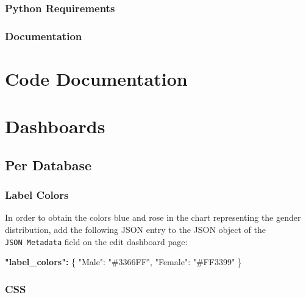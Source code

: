 \documentclass[
]{book}
\newenvironment{Shaded}{\begin{snugshade}}{\end{snugshade}}
\newcommand{\DataTypeTok}[1]{\textcolor[rgb]{0.13,0.29,0.53}{#1}}
\newcommand{\ErrorTok}[1]{\textcolor[rgb]{0.64,0.00,0.00}{\textbf{#1}}}
\newcommand{\FunctionTok}[1]{\textcolor[rgb]{0.00,0.00,0.00}{#1}}
\newcommand{\StringTok}[1]{\textcolor[rgb]{0.31,0.60,0.02}{#1}}
\begin{document}
\hypertarget{python-requirements}{%
\subsection*{Python Requirements}\label{python-requirements}}

\hypertarget{documentation}{%
\subsection*{Documentation}\label{documentation}}

\hypertarget{code-documentation}{%
\chapter{Code Documentation}\label{code-documentation}}

\hypertarget{dashboards}{%
\chapter{Dashboards}\label{dashboards}}

\hypertarget{PerDatabaseDashboard}{%
\section{Per Database}\label{PerDatabaseDashboard}}

\hypertarget{label-colors}{%
\subsection*{Label Colors}\label{label-colors}}

In order to obtain the colors blue and rose in the chart representing the gender distribution,
add the following JSON entry to the JSON object of the \texttt{JSON\ Metadata} field on the edit dashboard page:

\begin{Shaded}
\begin{Highlighting}[]
\ErrorTok{"label\_colors":} \FunctionTok{\{}
    \DataTypeTok{"Male"}\FunctionTok{:} \StringTok{"\#3366FF"}\FunctionTok{,} 
    \DataTypeTok{"Female"}\FunctionTok{:} \StringTok{"\#FF3399"}
\FunctionTok{\}}
\end{Highlighting}
\end{Shaded}

\hypertarget{css}{%
\subsection*{CSS}\label{css}}
\end{document}
